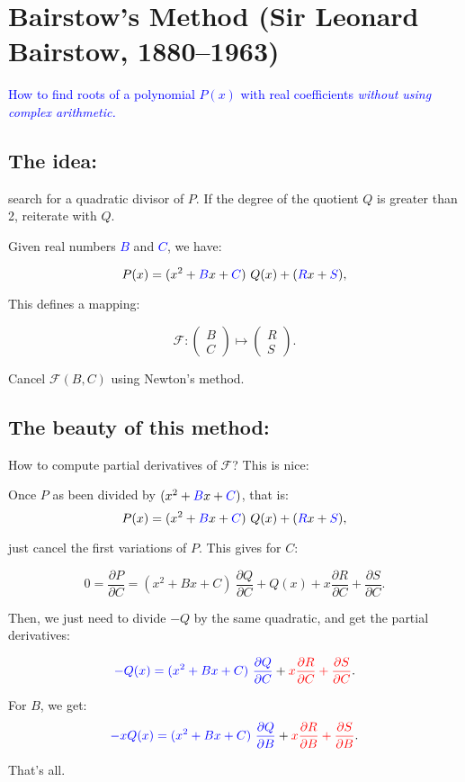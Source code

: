 \documentclass[11pt]{amsart}
\begin{document}
  \section*{Bairstow's Method (Sir Leonard Bairstow,
    1880--1963)}

  \begin{center}
    \textcolor{blue}{\large How to find roots of a polynomial  $P(x)$
      with real coefficients 
        \emph{without using complex arithmetic.}}
  \end{center}
   \subsection*{The idea:}    

  search for a quadratic divisor of $P$. If the degree of the quotient $Q$
  is greater than 2, reiterate with $Q$.

  
 

  Given real numbers \textcolor{blue}{$B$} and \textcolor{blue}{$C$},
  we have:

  $$P(x)= (x^2+\textcolor{blue}{B}x+\textcolor{blue}{C})\ Q(x)+ (\textcolor{blue}{R}x+\textcolor{blue}{S}),$$

  This defines a mapping:
  
$$\mathcal{F}: \begin{pmatrix}B \\ C  \end{pmatrix}
\mapsto  \begin{pmatrix}R\\S\end{pmatrix}.$$

  Cancel $\mathcal{F}(B,C)$ using Newton's method.

  \subsection*{The beauty of this method:}
  
How to compute partial derivatives of  $\mathcal{F}$? This is nice:

Once $P$ as been divided by
$(x^2+\textcolor{blue}{B}x+\textcolor{blue}{C})$, that is:
$$P(x)= (x^2+\textcolor{blue}{B}x+\textcolor{blue}{C})\ Q(x)+ (\textcolor{blue}{R}x+\textcolor{blue}{S}),$$

just cancel the first variations of $P$. This gives for $C$:

$$0 = \frac{\partial P}{\partial C}= (x^2+Bx+C)\ \frac{\partial
Q}{\partial C}+ Q(x) +x \frac{\partial R}{\partial C}+\frac{\partial
S}{\partial C}. $$

Then, we just need to divide $-Q$ by the same quadratic, and get the
partial derivatives:

$$\textcolor{blue}{-Q(x)=(x^2+Bx+C)\ \frac{\partial Q}{\partial C}}+\textcolor{red}{x \frac{\partial R}{\partial C}+\frac{\partial
S}{\partial C}} .$$

For $B$, we get:
$$\textcolor{blue}{-xQ(x)=(x^2+Bx+C)\ \frac{\partial Q}{\partial B}}+
\textcolor{red}{x \frac{\partial R}{\partial B}+\frac{\partial
S}{\partial B} }.$$

That's all.


  
\end{document}
